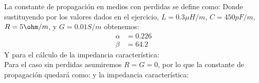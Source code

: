 
La constante de propagación en medios con perdidas se define como:
Donde sustituyendo por los valores dados en el ejercicio, $L=0.3\mu H/m$, $C=450pF/m$, $R=5\ohm /m$, y $G=0.01S/m$ obtenemos:
\begin{align*}
  \alpha &= 0.226 \\
    \beta &= 64.2
\end{align*}
Y para el cálculo de la impedancia característica:
\\[0.5cm]
Para el caso sin perdidas asumiremos $R = G= 0$, por lo que la constante de propagación quedará como:
y la impedancia característica:
\impedancenoloss{= 25.8 \Omega}
